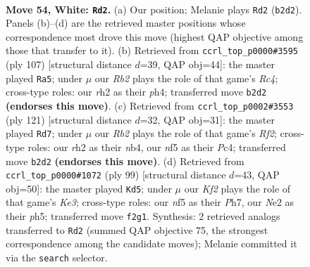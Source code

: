 \documentclass[11pt]{article}
\begin{document}
\clearpage

\begin{figure}[p]\centering
\begin{subfigure}{0.46\textwidth}\centering
\resizebox{\linewidth}{!}{%
\newchessgame
\chessboard[
  setfen={1r6/2R5/3pk3/5n1p/6p1/1p6/1R2NKPr/8 w - - 0 54},
  showmover=false,
  pgfstyle=straightmove, color=movearrow, markmove={b2-d2}
]}
\caption{}
\end{subfigure}\hfill
\begin{subfigure}{0.46\textwidth}\centering
\resizebox{\linewidth}{!}{%
\newchessgame
\chessboard[
  setfen={5k2/2n4p/6p1/2r5/P1PN3P/5P2/2R2K2/8 b - - 0 54},
  showmover=false,
  pgfstyle=straightmove, color=movearrow, markmove={c5-a5}
]}
\caption{}
\end{subfigure}
\\[4pt]
\begin{subfigure}{0.46\textwidth}\centering
\resizebox{\linewidth}{!}{%
\newchessgame
\chessboard[
  setfen={7k/5r1n/p2P4/P7/1Np2P2/5R1P/7K/8 b - - 0 61},
  showmover=false,
  pgfstyle=straightmove, color=movearrow, markmove={f7-d7}
]}
\caption{}
\end{subfigure}\hfill
\begin{subfigure}{0.46\textwidth}\centering
\resizebox{\linewidth}{!}{%
\newchessgame
\chessboard[
  setfen={8/7p/r3k3/P3p2P/R1N2pK1/5P2/2n5/8 b - - 5 50},
  showmover=false,
  pgfstyle=straightmove, color=movearrow, markmove={e6-d5}
]}
\caption{}
\end{subfigure}
\caption{\textbf{Move 54, White: \texttt{Rd2}.} (a) Our position; Melanie plays \texttt{Rd2} (\texttt{b2d2}). Panels (b)--(d) are the retrieved master positions whose correspondence most drove this move (highest QAP objective among those that transfer to it). (b) Retrieved from \texttt{ccrl\_top\_p0000\#3595} (ply 107) [structural distance $d$=39, QAP obj=44]: the master played \texttt{Ra5}; under $\mu$ our \emph{Rb2} plays the role of that game's \emph{Rc4}; cross-type roles: our \emph{r}h2 as their \emph{p}h4; transferred move \texttt{b2d2} \textbf{(endorses this move)}. (c) Retrieved from \texttt{ccrl\_top\_p0002\#3553} (ply 121) [structural distance $d$=32, QAP obj=31]: the master played \texttt{Rd7}; under $\mu$ our \emph{Rb2} plays the role of that game's \emph{Rf2}; cross-type roles: our \emph{r}h2 as their \emph{n}b4, our \emph{n}f5 as their \emph{P}c4; transferred move \texttt{b2d2} \textbf{(endorses this move)}. (d) Retrieved from \texttt{ccrl\_top\_p0000\#1072} (ply 99) [structural distance $d$=43, QAP obj=50]: the master played \texttt{Kd5}; under $\mu$ our \emph{Kf2} plays the role of that game's \emph{Ke3}; cross-type roles: our \emph{n}f5 as their \emph{P}h7, our \emph{N}e2 as their \emph{p}h5; transferred move \texttt{f2g1}. Synthesis: 2 retrieved analogs transferred to \texttt{Rd2} (summed QAP objective 75, the strongest correspondence among the candidate moves); Melanie committed it via the \texttt{search} selector.}
\label{fig:thought-m106}
\end{figure}
\end{document}

